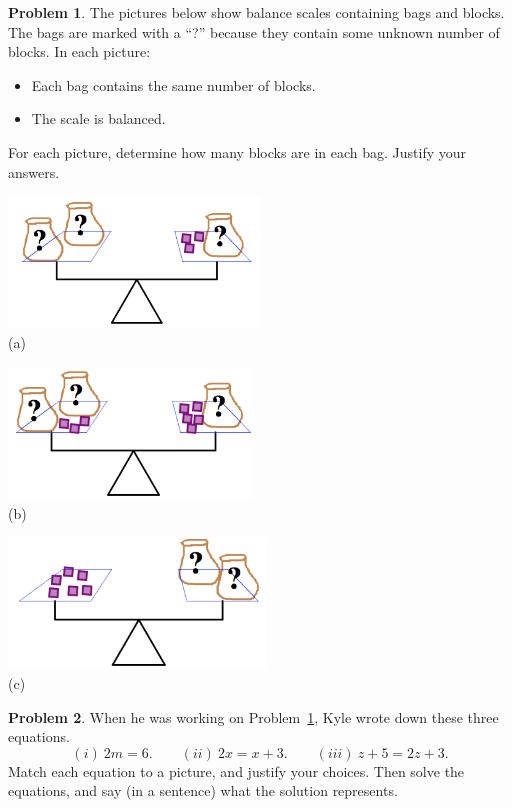 \documentclass[12pt, reqno]{amsart}
\theoremstyle{remark}
\theoremstyle{definition}
\newtheorem{problem}{Problem}
\numberwithin{equation}{section}  %
\begin{document}
\bigskip


\begin{problem}\label{prob: bagsblocks}
The pictures below show balance scales containing bags and blocks.  The bags are marked with a ``?'' because they contain some unknown number of blocks.  In each picture:
\begin{itemize}
\item
Each bag contains the same number of blocks. 
\item
The scale is balanced.
\end{itemize}
For each picture, determine how many blocks are in each bag.  Justify your answers.

\begin{center}
\includegraphics[height=3.5cm]{bags1}\\
(a)

\bigskip

\includegraphics[height=3.5cm]{bags2}\\
(b)

\bigskip

\includegraphics[height=3.5cm]{bags3}\\
(c)


\end{center}
\end{problem}


\bigskip

\begin{problem}
When he was working on Problem~\ref{prob: bagsblocks}, Kyle wrote down these three equations.  
\[
(i)\ 2m = 6.
\qquad
(ii)\ 2x = x + 3.
\qquad
(iii)\ z + 5 = 2z + 3. 
\]
Match each equation to a picture, and justify your choices.  Then solve the equations, and say (in a sentence) what the solution represents.

\end{problem}
\end{document}
